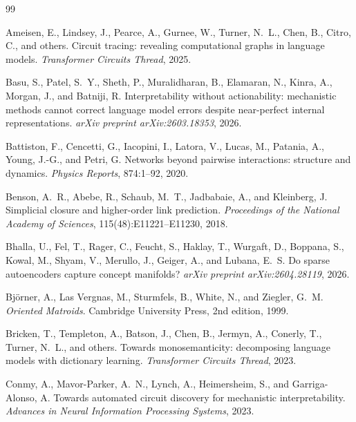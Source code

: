 \documentclass[11pt]{article}
\begin{document}
\begin{thebibliography}{99}
\small

Ameisen, E., Lindsey, J., Pearce, A., Gurnee, W., Turner, N.~L., Chen, B., Citro, C., and others.
\newblock Circuit tracing: revealing computational graphs in language models.
\newblock \emph{Transformer Circuits Thread}, 2025.

Basu, S., Patel, S.~Y., Sheth, P., Muralidharan, B., Elamaran, N., Kinra, A., Morgan, J., and Batniji, R.
\newblock Interpretability without actionability: mechanistic methods cannot correct language model errors despite near-perfect internal representations.
\newblock \emph{arXiv preprint arXiv:2603.18353}, 2026.

Battiston, F., Cencetti, G., Iacopini, I., Latora, V., Lucas, M., Patania, A., Young, J.-G., and Petri, G.
\newblock Networks beyond pairwise interactions: structure and dynamics.
\newblock \emph{Physics Reports}, 874:1--92, 2020.

Benson, A.~R., Abebe, R., Schaub, M.~T., Jadbabaie, A., and Kleinberg, J.
\newblock Simplicial closure and higher-order link prediction.
\newblock \emph{Proceedings of the National Academy of Sciences}, 115(48):E11221--E11230, 2018.

Bhalla, U., Fel, T., Rager, C., Feucht, S., Haklay, T., Wurgaft, D., Boppana, S., Kowal, M., Shyam, V., Merullo, J., Geiger, A., and Lubana, E.~S.
\newblock Do sparse autoencoders capture concept manifolds?
\newblock \emph{arXiv preprint arXiv:2604.28119}, 2026.

Bj\"orner, A., Las Vergnas, M., Sturmfels, B., White, N., and Ziegler, G.~M.
\newblock \emph{Oriented Matroids}.
\newblock Cambridge University Press, 2nd edition, 1999.

Bricken, T., Templeton, A., Batson, J., Chen, B., Jermyn, A., Conerly, T., Turner, N.~L., and others.
\newblock Towards monosemanticity: decomposing language models with dictionary learning.
\newblock \emph{Transformer Circuits Thread}, 2023.

Conmy, A., Mavor-Parker, A.~N., Lynch, A., Heimersheim, S., and Garriga-Alonso, A.
\newblock Towards automated circuit discovery for mechanistic interpretability.
\newblock \emph{Advances in Neural Information Processing Systems}, 2023.


\end{thebibliography}
\end{document}
